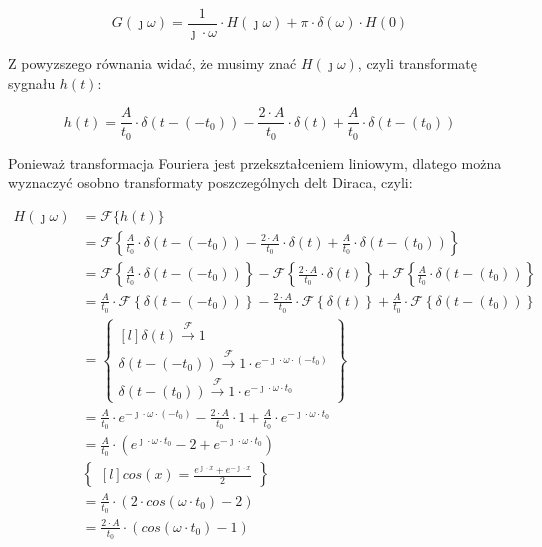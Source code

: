 \begin{task}
\begin{equation}
G(\jmath \omega) = \frac{1}{\jmath \cdot \omega} \cdot H(\jmath \omega) + \pi \cdot \delta(\omega) \cdot H(0)
\end{equation}

Z powyzszego równania widać, że musimy znać $H(\jmath \omega)$, czyli transformatę sygnału $h(t)$:

\begin{equation}
h(t) = \frac{A}{t_{0}} \cdot \delta(t-(-t_{0})) -\frac{2 \cdot A}{t_{0}} \cdot \delta(t) + \frac{A}{t_{0}} \cdot \delta(t-(t_{0}))
\end{equation}

Ponieważ transformacja Fouriera jest przekształceniem liniowym, dlatego można wyznaczyć osobno transformaty poszczególnych delt Diraca, czyli:

\begin{align*}
H(\jmath \omega)&={\mathcal F}\{h(t)\}\\
&={\mathcal F}\left\{\frac{A}{t_{0}} \cdot \delta(t-(-t_{0})) -\frac{2 \cdot A}{t_{0}} \cdot \delta(t) + \frac{A}{t_{0}} \cdot \delta(t-(t_{0}))\right\}\\
&={\mathcal F}\left\{\frac{A}{t_{0}} \cdot \delta(t-(-t_{0}))\right\} - {\mathcal F}\left\{\frac{2 \cdot A}{t_{0}} \cdot \delta(t)\right\} + {\mathcal F}\left\{\frac{A}{t_{0}} \cdot \delta(t-(t_{0}))\right\}\\
&=\frac{A}{t_{0}} \cdot {\mathcal F}\left\{\delta(t-(-t_{0}))\right\} - \frac{2 \cdot A}{t_{0}} \cdot {\mathcal F}\left\{\delta(t)\right\} + \frac{A}{t_{0}} \cdot {\mathcal F}\left\{\delta(t-(t_{0}))\right\}\\
&=\begin{Bmatrix*}[l]
\delta(t)\xrightarrow{\mathcal F} 1\\
\delta(t-(-t_{0}))\xrightarrow{\mathcal F} 1 \cdot e^{-\jmath \cdot \omega \cdot (-t_{0})}\\
\delta(t-(t_{0}))\xrightarrow{\mathcal F} 1 \cdot e^{-\jmath \cdot \omega \cdot t_{0}}
\end{Bmatrix*}\\
&=\frac{A}{t_{0}} \cdot e^{-\jmath \cdot \omega \cdot (-t_{0})} - \frac{2 \cdot A}{t_{0}} \cdot 1 + \frac{A}{t_{0}} \cdot e^{-\jmath \cdot \omega \cdot t_{0}}\\
&=\frac{A}{t_{0}} \cdot \left(e^{\jmath \cdot \omega \cdot t_{0}} -2 + e^{-\jmath \cdot \omega \cdot t_{0}}\right)\\
&\begin{Bmatrix*}[l]
cos(x)=\frac{e^{\jmath \cdot x} + e^{-\jmath \cdot x}}{2}
\end{Bmatrix*}\\
&=\frac{A}{t_{0}} \cdot \left(2 \cdot cos(\omega \cdot t_{0}) -2\right)\\
&=\frac{2 \cdot A}{t_{0}} \cdot \left(cos(\omega \cdot t_{0}) -1\right)\\
\end{align*}


\end{task}
